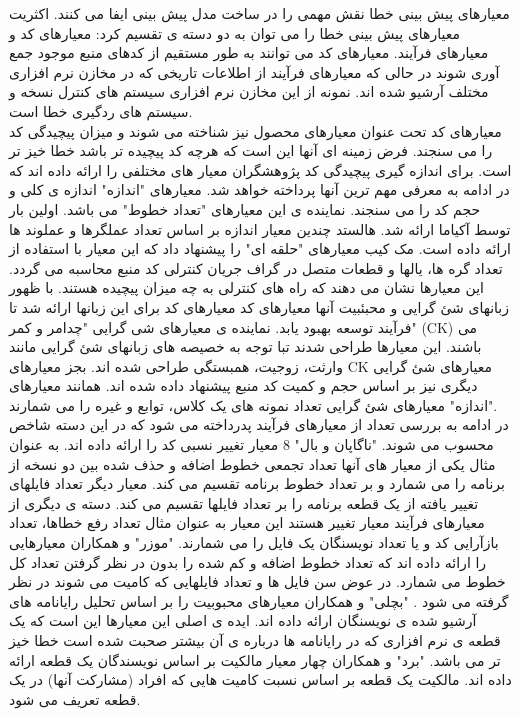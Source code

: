 معیارهای پیش بینی خطا نقش مهمی را در ساخت مدل پیش بینی ایفا می کنند. اکثریت معیارهای پیش بینی خطا را می توان به دو دسته ی تقسیم کرد: معیارهای کد و معیارهای فرآیند. معیارهای کد می توانند به طور مستقیم از کدهای منبع موجود جمع آوری شوند در حالی که معیارهای فرآیند  از اطلاعات تاریخی که در مخازن نرم افزاری مختلف آرشیو شده اند. نمونه از این مخازن نرم افزاری سیستم های کنترل نسخه و سیستم های ردگیری خطا است. \\
معیارهای کد تحت عنوان معیارهای محصول 
نیز شناخته می شوند و میزان پیچیدگی کد را می سنجند. فرض زمینه ای آنها این است که هرچه کد پیچیده تر باشد خطا خیز تر است. برای اندازه گیری پیچیدگی کد پژوهشگران معیار های مختلفی را ارائه داده اند که در ادامه به معرفی مهم ترین آنها پرداخته خواهد شد. معیارهای "اندازه" اندازه ی کلی و حجم کد را می سنجند. نماینده ی این معیارهای "تعداد خطوط" می باشد. اولین بار توسط آکیاما  \cite{akiyama1971example}  ارائه شد. هالستد  \cite{halstead1977elements} چندین معیار اندازه بر اساس  تعداد عملگرها و عملوند ها ارائه داده است. مک کیب معیارهای "حلقه ای" 
را پیشنهاد داد که این معیار با استفاده از تعداد گره ها، یالها و قطعات متصل در گراف جریان کنترلی کد منبع محاسبه می گردد\cite{mccabe1976complexity}. این معیارها نشان می دهند که راه های کنترلی به چه میزان پیچیده هستند. با ظهور زبانهای شئ گرایی و محبئبیت آنها معیارهای کد معیارهای کد برای این زبانها ارائه شد تا فرآیند توسعه بهبود یابد. نماینده ی معیارهای شی گرایی "چدامر و کمر" (CK) می باشند\cite{chidamber1994metrics}. این معیارها طراحی شدند تبا توجه به خصیصه های زبانهای شئ گرایی مانند وارثت، زوجیت، همبستگی طراحی شده اند. بجز معیارهای CK معیارهای شئ گرایی دیگری نیز بر اساس حجم و کمیت کد منبع پیشنهاد داده شده اند. همانند معیارهای "اندازه" معیارهای شئ گرایی تعداد نمونه های یک کلاس، توابع و غیره را می شمارند. \\
در ادامه به بررسی تعداد از معیارهای فرآیند پدرداخته می شود که در این دسته شاخص محسوب می شوند. "ناگاپان و بال" 8 معیار تغییر نسبی کد را ارائه داده اند\cite{nagappan2005use}. به عنوان مثال یکی از معیار های آنها تعداد تجمعی خطوط اضافه و حذف شده بین دو نسخه از برنامه را می شمارد و بر تعداد خطوط برنامه تقسیم می کند. معیار دیگر تعداد فایلهای تغییر یافته از یک قطعه برنامه را بر تعداد فایلها تقسیم می کند. دسته ی دیگری از معیارهای فرآیند معیار تغییر هستند این معیار به عنوان مثال تعداد رفع خطاها، تعداد بازآرایی کد  و یا تعداد نویسنگان یک فایل را می شمارند. "موزر" و همکاران معیارهایی را ارائه داده اند که تعداد خطوط اضافه و کم شده را بدون در نظر گرفتن تعداد کل خطوط می شمارد. در عوض سن فایل ها و تعداد فایلهایی که کامیت می شوند در نظر گرفته می شود \cite{moser2008comparative}.  "بچلی" و همکاران معیارهای محبوبیت را بر اساس تحلیل رایانامه های آرشیو شده ی نویسنگان ارائه داده اند. ایده ی اصلی این معیارها این است که یک قطعه ی  نرم افزاری که در رایانامه ها درباره ی آن بیشتر صحبت شده است خطا خیز تر می باشد\cite{bacchelli2010popular}. "برد" و همکاران چهار معیار مالکیت بر اساس نویسندگان یک قطعه ارائه داده اند. مالکیت یک قطعه بر اساس نسبت کامیت هایی که افراد (مشارکت آنها) در یک قطعه  تعریف می شود. 
